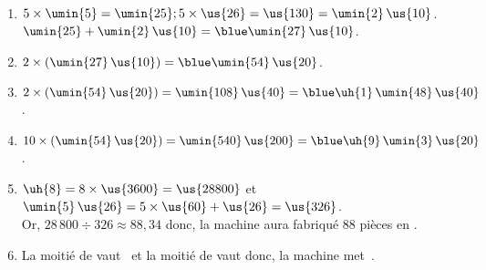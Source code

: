    \ \\ [-5mm]
   \begin{enumerate}
      \item $5\times\umin{5} =\umin{25} ; 5\times\us{26} =\us{130} =\umin{2}\,\us{10}$. \\
         $\umin{25}+\umin{2}\,\us{10} =\blue \umin{27}\,\us{10}$.
      \item $2\times(\umin{27}\,\us{10}) =\blue \umin{54}\,\us{20}$.
      \item $2\times(\umin{54}\,\us{20}) =\umin{108}\,\us{40} =\blue \uh{1}\,\umin{48}\,\us{40}$.
      \item $10\times(\umin{54}\,\us{20}) =\umin{540}\,\us{200} =\blue \uh{9}\,\umin{3}\,\us{20}$.
      \item $\uh{8} =8\times\us{3600} =\us{28800}$ et $\umin{5}\,\us{26} =5\times\us{60}+\us{26} =\us{326}$. \\
      Or, $28\,800\div326 \approx88,34$ donc, {\blue la machine aura fabriqué 88 pièces en }.
      \item La moitié de  vaut \, et la moitié de  vaut  donc, {\blue la machine met \,}.
   \end{enumerate}
